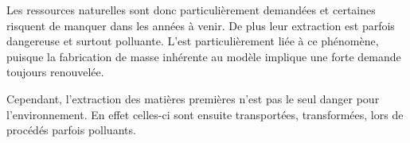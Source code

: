 \medbreak Les ressources naturelles sont donc particulièrement demandées et certaines risquent de manquer dans les années à venir. De plus leur extraction est parfois dangereuse et surtout polluante. L'\op est particulièrement liée à ce phénomène, puisque la fabrication de masse inhérente au modèle implique une forte demande toujours renouvelée. 

Cependant, l'extraction des matières premières n'est pas le seul danger pour l'environnement. En effet celles-ci sont ensuite transportées, transformées, lors de procédés parfois polluants.






